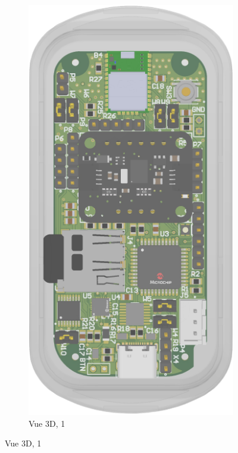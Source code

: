 \begin{figure}[!h]
	\centering
	\begin{subfigure}[b]{0.24\textwidth}
		\centering
		\includegraphics[width=\textwidth]{../figures/dev-pcb/3d-view3}
		\caption{Vue 3D, 1}

\end{subfigure}
\end{figure}
